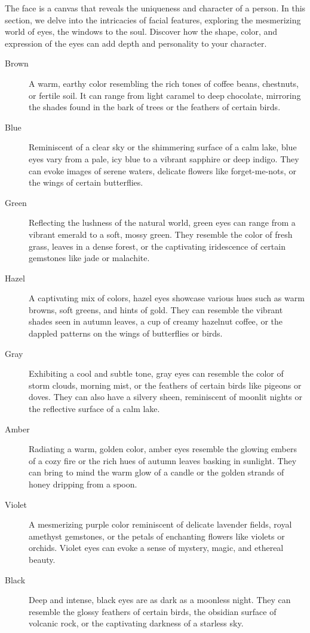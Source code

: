 \documentclass[12pt]{book}  %
\begin{document}
The face is a canvas that reveals the uniqueness and character of a person. In this section, we delve into the intricacies of facial features, exploring the mesmerizing world of eyes, the windows to the soul. Discover how the shape, color, and expression of the eyes can add depth and personality to your character.

\begin{description}
    \item[Brown] A warm, earthy color resembling the rich tones of coffee beans, chestnuts, or fertile soil. It can range from light caramel to deep chocolate, mirroring the shades found in the bark of trees or the feathers of certain birds.
    \item[Blue] Reminiscent of a clear sky or the shimmering surface of a calm lake, blue eyes vary from a pale, icy blue to a vibrant sapphire or deep indigo. They can evoke images of serene waters, delicate flowers like forget-me-nots, or the wings of certain butterflies.
    \item[Green] Reflecting the lushness of the natural world, green eyes can range from a vibrant emerald to a soft, mossy green. They resemble the color of fresh grass, leaves in a dense forest, or the captivating iridescence of certain gemstones like jade or malachite.
    \item[Hazel] A captivating mix of colors, hazel eyes showcase various hues such as warm browns, soft greens, and hints of gold. They can resemble the vibrant shades seen in autumn leaves, a cup of creamy hazelnut coffee, or the dappled patterns on the wings of butterflies or birds.
    \item[Gray] Exhibiting a cool and subtle tone, gray eyes can resemble the color of storm clouds, morning mist, or the feathers of certain birds like pigeons or doves. They can also have a silvery sheen, reminiscent of moonlit nights or the reflective surface of a calm lake.
    \item[Amber] Radiating a warm, golden color, amber eyes resemble the glowing embers of a cozy fire or the rich hues of autumn leaves basking in sunlight. They can bring to mind the warm glow of a candle or the golden strands of honey dripping from a spoon.
    \item[Violet] A mesmerizing purple color reminiscent of delicate lavender fields, royal amethyst gemstones, or the petals of enchanting flowers like violets or orchids. Violet eyes can evoke a sense of mystery, magic, and ethereal beauty.
    \item[Black] Deep and intense, black eyes are as dark as a moonless night. They can resemble the glossy feathers of certain birds, the obsidian surface of volcanic rock, or the captivating darkness of a starless sky.

\end{description}
\end{document}
